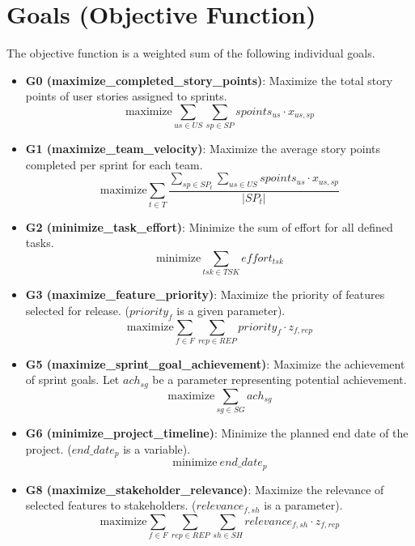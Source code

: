 \documentclass[11pt]{article}
\begin{document}
\section{Goals (Objective Function)}
The objective function is a weighted sum of the following individual goals.
\begin{itemize}
    \item \textbf{G0 (maximize\_completed\_story\_points)}: Maximize the total story points of user stories assigned to sprints.
    $$ \text{maximize} \sum_{us \in US} \sum_{sp \in SP} spoints_{us} \cdot x_{us, sp} $$
    \item \textbf{G1 (maximize\_team\_velocity)}: Maximize the average story points completed per sprint for each team.
    $$ \text{maximize} \sum_{t \in T} \frac{\sum_{sp \in SP_t} \sum_{us \in US} spoints_{us} \cdot x_{us, sp}}{|SP_t|} $$
    \item \textbf{G2 (minimize\_task\_effort)}: Minimize the sum of effort for all defined tasks.
    $$ \text{minimize} \sum_{tsk \in TSK} effort_{tsk} $$
    \item \textbf{G3 (maximize\_feature\_priority)}: Maximize the priority of features selected for release. ($priority_f$ is a given parameter).
    $$ \text{maximize} \sum_{f \in F} \sum_{rep \in REP} priority_f \cdot z_{f, rep} $$
    \item \textbf{G5 (maximize\_sprint\_goal\_achievement)}: Maximize the achievement of sprint goals. Let $ach_{sg}$ be a parameter representing potential achievement.
    $$ \text{maximize} \sum_{sg \in SG} ach_{sg} $$
    \item \textbf{G6 (minimize\_project\_timeline)}: Minimize the planned end date of the project. ($end\_date_p$ is a variable).
    $$ \text{minimize} \: end\_date_p $$
    \item \textbf{G8 (maximize\_stakeholder\_relevance)}: Maximize the relevance of selected features to stakeholders. ($relevance_{f,sh}$ is a parameter).
    $$ \text{maximize} \sum_{f \in F} \sum_{rep \in REP} \sum_{sh \in SH} relevance_{f,sh} \cdot z_{f, rep} $$
\end{itemize}
\newpage
\end{document}
